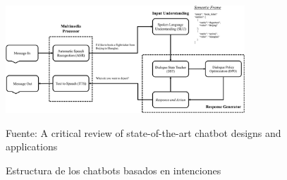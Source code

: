 \begin{itemize}
\begin{figure}[h]
\centering
\includegraphics[width=0.8\textwidth]{imagenes/02_EstadoDelArte/estructura_intent.png}
\begin{center}
Fuente: A critical review of state-of-the-art chatbot designs and applications \cite{RefWorks:RefID:36-luo2022critical}
\end{center}
\caption{Estructura de los chatbots basados en intenciones}
\label{fig:estructura_intent}
\end{figure}


\end{itemize}
